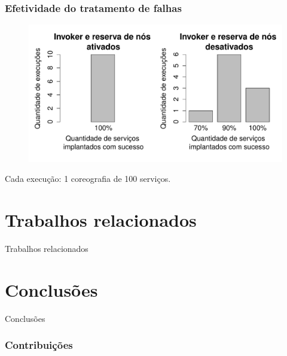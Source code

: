 \documentclass{beamer}
\newcommand\sectiontitle[1]{\begin{center}\huge#1\end{center}}
\begin{document}
\begin{frame}
\frametitle{Efetividade do tratamento de falhas}

\begin{figure}
\includegraphics[width=0.9\linewidth]{img/error_handling}
\end{figure}

Cada execução: 1 coreografia de 100 serviços.

\end{frame}


\section{Trabalhos relacionados}

\begin{frame}

\sectiontitle{Trabalhos relacionados}

\end{frame}


\section{Conclusões}

\begin{frame}

\sectiontitle{Conclusões}

\end{frame}



\begin{frame}
\frametitle{Contribuições}

\end{frame}
\end{document}
